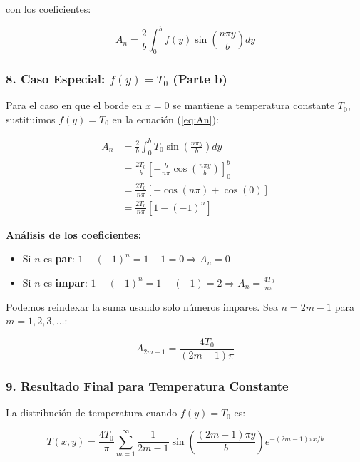 \documentclass[a4paper]{article}
\begin{document}
con los coeficientes:

\begin{equation}
\boxed{A_n = \frac{2}{b} \int_0^b f(y) \sin\left(\frac{n\pi y}{b}\right) dy}
\end{equation}

\subsubsection{8. Caso Especial: $f(y) = T_0$ (Parte b)}

Para el caso en que el borde en $x = 0$ se mantiene a temperatura constante $T_0$, sustituimos $f(y) = T_0$ en la ecuación (\ref{eq:An}):

\begin{align}
A_n &= \frac{2}{b} \int_0^b T_0 \sin\left(\frac{n\pi y}{b}\right) dy \\
&= \frac{2T_0}{b} \left[-\frac{b}{n\pi} \cos\left(\frac{n\pi y}{b}\right)\right]_0^b \\
&= \frac{2T_0}{n\pi} \left[-\cos(n\pi) + \cos(0)\right] \\
&= \frac{2T_0}{n\pi} \left[1 - (-1)^n\right]
\end{align}

\textbf{Análisis de los coeficientes:}
\begin{itemize}
    \item Si $n$ es \textbf{par}: $1 - (-1)^n = 1 - 1 = 0 \Rightarrow A_n = 0$
    \item Si $n$ es \textbf{impar}: $1 - (-1)^n = 1 - (-1) = 2 \Rightarrow A_n = \frac{4T_0}{n\pi}$
\end{itemize}

Podemos reindexar la suma usando solo números impares. Sea $n = 2m - 1$ para $m = 1, 2, 3, \ldots$:

\begin{equation}
A_{2m-1} = \frac{4T_0}{(2m-1)\pi}
\end{equation}

\subsubsection{9. Resultado Final para Temperatura Constante}

La distribución de temperatura cuando $f(y) = T_0$ es:

\begin{equation}
\boxed{T(x, y) = \frac{4T_0}{\pi} \sum_{m=1}^{\infty} \frac{1}{2m-1} \sin\left(\frac{(2m-1)\pi y}{b}\right) e^{-(2m-1)\pi x/b}}
\end{equation}
\end{document}
